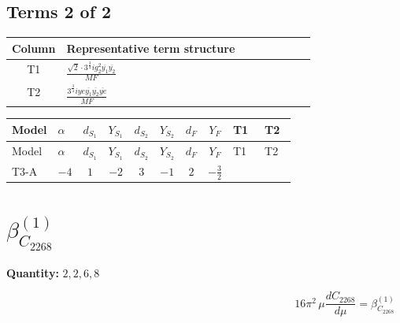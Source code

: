 \documentclass[8pt]{article}
\begin{document}
\begin{landscape}
\subsection*{Terms 2 of 2}
\begin{center}
\begin{tabular}{@{}c >{\raggedright\arraybackslash}p{0.82\linewidth}@{}}
\toprule
Column & Representative term structure \\
\midrule
T1 & \(\displaystyle \frac{\sqrt{2} \cdot 3^{\frac{3}{4}} i g_{2}^{2} \overline{y_{1}} \overline{y_{2}}}{MF}\) \\
\midrule
T2 & \(\displaystyle \frac{3^{\frac{3}{4}} i ye \overline{y_{1}} \overline{y_{2}} \overline{ye}}{MF}\) \\
\midrule
\bottomrule
\end{tabular}
\end{center}
\smallskip
\tiny
\begin{longtable}{@{}llcccccc >{\raggedright\arraybackslash}p{0.21\linewidth} >{\raggedright\arraybackslash}p{0.21\linewidth}@{}}
\toprule
Model & $\alpha$ & $d_{S_1}$ & $Y_{S_1}$ & $d_{S_2}$ & $Y_{S_2}$ & $d_F$ & $Y_F$ & T1 & T2 \\
\midrule
\endfirsthead
\toprule
Model & $\alpha$ & $d_{S_1}$ & $Y_{S_1}$ & $d_{S_2}$ & $Y_{S_2}$ & $d_F$ & $Y_F$ & T1 & T2 \\
\midrule
\endhead
T3-A & $-4$ & $1$ & $-2$ & $3$ & $-1$ & $2$ & $-\frac{3}{2}$ & \scriptsize\adjustbox{max width=\linewidth}{$\begin{gathered} - \frac{\sqrt{2} \cdot 3^{\frac{3}{4}} i g_{2}^{2} \overline{y_{1}} \overline{y_{2}}}{3 MF}\end{gathered}$} & \scriptsize\adjustbox{max width=\linewidth}{$\begin{gathered} \frac{3^{\frac{3}{4}} i ye \overline{y_{1}} \overline{y_{2}} \overline{ye}}{12 MF}\end{gathered}$} \\
\midrule
\bottomrule
\end{longtable}
\clearpage
\section*{$\beta_{C_{2268}}^{(1)}$}
\noindent\textbf{Quantity: }$\mathrm{2,2,6,8}$\par\smallskip
\[16\pi^2\,\mu\frac{d C_{2268}}{d\mu}=\beta_{C_{2268}}^{(1)}\]

\end{landscape}
\end{document}
